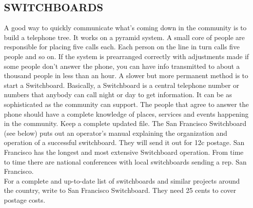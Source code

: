\documentclass[11pt,twoside,a4paper]{book}
\begin{document}
\subsection{SWITCHBOARDS}

	A good way to quickly communicate what's coming down in the community is to build a telephone tree. It works on a pyramid system. A small core of people are responsible for placing five calls each. Each person on the line in turn calls five people and so on. If the system is prearranged correctly with adjustments made if some people don't answer the phone, you can have info transmitted to about a thousand people in less than an hour. A slower but more permanent method is to start a Switchboard. Basically, a Switchboard is a central telephone number or numbers that anybody can call night or day to get information. It can be as sophisticated as the community can support. The people that agree to answer the phone should have a complete knowledge of places, services and events happening in the community. Keep a complete updated file. The San Francisco Switchboard (see below) puts out an operator's manual explaining the organization and operation of a successful switchboard. They will send it out for 12c postage. San Francisco has the longest and most extensive Switchboard operation. From time to time there are national conferences with local switchboards sending a rep. San Francisco.~\\
	
For a complete and up-to-date list of switchboards and similar projects around the country, write to San Francisco Switchboard. They need 25 cents to cover postage costs.~\\

\clearpage
\end{document}
